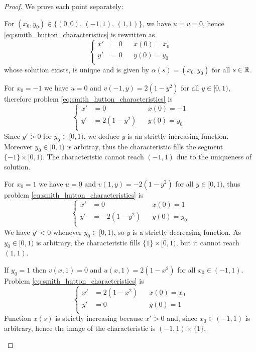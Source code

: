 \begin{proof}
	We prove each point separately:
	\begin{enumerateprop}
		\item For  $(x_0, y_0) \in \{ (0,0), \, (-1,1), \, (1,1) \}$, we have $u
		= v = 0$, hence \eqref{eq:smith_hutton_characteristics} is rewritten as
		\[
			\left\{
				\begin{aligned}
					x' &= 0 	& &x(0) = x_0 \\
					y' &= 0 	& &y(0) = y_0 \\
				\end{aligned}
			\right.
		\]
		whose solution exists, is unique and is given by $\alpha(s) = (x_0,
		y_0)$ for all $s \in \mathbb{R}$.
		\item For $x_0 = -1$ we have $u = 0$ and $v(-1,y) = 2(1 - y^2)$ for all
		$y \in [0,1)$, therefore problem \eqref{eq:smith_hutton_characteristics}
		is
		\[
			\left\{
				\begin{aligned}
					x' &= 0 			& &x(0) = -1 \\
					y' &= 2(1 - y^2) 	& &y(0) = y_0 \\
				\end{aligned}
			\right.
		\]
		Since $y' > 0$ for $y_0 \in [0,1)$, we deduce $y$ is an strictly
		increasing function. Moreover $y_0 \in [0,1)$ is arbitray, thus the
		characteristic fills the segment $\{-1\} \times [0,1)$. The
		characteristic cannot reach $(-1,1)$ due to the uniqueness of solution.

		\item For $x_0 = 1$ we have $u = 0$ and $v(1,y) = -2(1 - y^2)$ for all
		$y \in [0,1)$, thus problem \eqref{eq:smith_hutton_characteristics} is
		\[
			\left\{
				\begin{aligned}
					x' &= 0 			& &x(0) = 1 \\
					y' &= -2(1 - y^2) 	& &y(0) = y_0 \\
				\end{aligned}
			\right.
		\]
		We have $y' < 0$ whenever $y_0 \in [0,1)$, so $y$ is a strictly
		decreasing function. As $y_0 \in [0,1)$ is arbitrary, the characteristic
		fills $\{ 1 \} \times [0,1)$, but it cannot reach $(1,1)$.

		\item If $y_0 = 1$ then $v(x,1) = 0$ and $u(x,1) = 2(1-x^2)$ for all
		$x_0 \in (-1,1)$. Problem \eqref{eq:smith_hutton_characteristics} is
		\[
			\left\{
				\begin{aligned}
					x' &= 2(1-x^2) 	& &x(0) = x_0 \\
					y' &= 0 		& &y(0) = 1 \\
				\end{aligned}
			\right.
		\]
		Function $x(s)$ is strictly increasing because $x' > 0$ and, since $x_0 \in
		(-1,1)$ is arbitrary, hence the image of the characteristic is $(-1,1) \times
		\{ 1 \}$.				
	\end{enumerateprop}
\end{proof}

